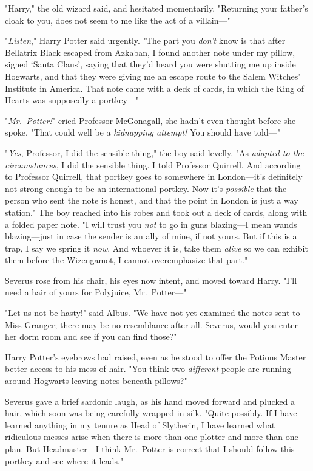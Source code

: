 "Harry," the old wizard said, and hesitated momentarily. "Returning your 
father's cloak to you, does not seem to me like the act of a villain---"

"\emph{Listen}," Harry Potter said urgently. "The part you \emph{don't} know is 
that after Bellatrix Black escaped from Azkaban, I found another note under my 
pillow, signed `Santa Claus', saying that they'd heard you were shutting me up 
inside Hogwarts, and that they were giving me an escape route to the Salem 
Witches' Institute in America. That note came with a deck of cards, in which 
the King of Hearts was supposedly a portkey---"

"\emph{Mr.~Potter!}" cried Professor McGonagall, she hadn't even thought before 
she spoke. "That could well be a \emph{kidnapping attempt!} You should have 
told---"

"\emph{Yes}, Professor, I did the sensible thing," the boy said levelly. "As 
\emph{adapted to the circumstances}, I did the sensible thing. I told Professor 
Quirrell. And according to Professor Quirrell, that portkey goes to somewhere 
in London---it's definitely not strong enough to be an international portkey. 
Now it's \emph{possible} that the person who sent the note is honest, and that 
the point in London is just a way station." The boy reached into his robes and 
took out a deck of cards, along with a folded paper note. "I will trust you 
\emph{not} to go in guns blazing---I mean wands blazing---just in case the 
sender is an ally of mine, if not yours. But if this is a trap, I say we spring 
it \emph{now}. And whoever it is, take them \emph{alive} so we can exhibit them 
before the Wizengamot, I cannot overemphasize that part."

Severus rose from his chair, his eyes now intent, and moved toward Harry. "I'll 
need a hair of yours for Polyjuice, Mr.~Potter---"

"Let us not be hasty!" said Albus. "We have not yet examined the notes sent to 
Miss Granger; there may be no resemblance after all. Severus, would you enter 
her dorm room and see if you can find those?"

Harry Potter's eyebrows had raised, even as he stood to offer the Potions 
Master better access to his mess of hair. "You think two \emph{different} 
people are running around Hogwarts leaving notes beneath pillows?"

Severus gave a brief sardonic laugh, as his hand moved forward and plucked a 
hair, which soon was being carefully wrapped in silk. "Quite possibly. If I 
have learned anything in my tenure as Head of Slytherin, I have learned what 
ridiculous messes arise when there is more than one plotter and more than one 
plan. But Headmaster---I think Mr.~Potter is correct that I should follow this 
portkey and see where it leads."

